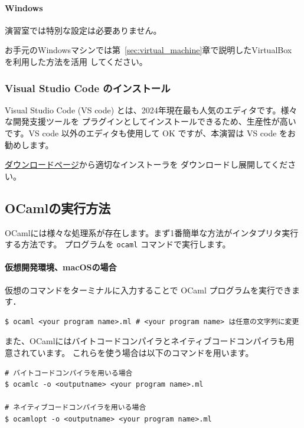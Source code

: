 \documentclass[a4paper,11pt]{jsarticle}
\begin{document}
\paragraph{Windows}

演習室では特別な設定は必要ありません。

お手元のWindowsマシンでは第~\ref{sec:virtual_machine}章で説明したVirtualBox を利用した方法を活用
してください。

\subsubsection{Visual Studio Code のインストール}

Visual Studio Code (VS code) とは、2024年現在最も人気のエディタです。様々な開発支援ツールを
プラグインとしてインストールできるため、生産性が高いです。VS code 以外のエディタも使用して
OK ですが、本演習は VS code をお勧めします。

\href{https://code.visualstudio.com/download}{ダウンロードページ}から適切なインストーラを
ダウンロードし展開してください。

\subsection{OCamlの実行方法}

OCamlには様々な処理系が存在します。まず1番簡単な方法がインタプリタ実行する方法です。
プログラムを \verb|ocaml| コマンドで実行します。

\paragraph*{仮想開発環境、macOSの場合}

仮想のコマンドをターミナルに入力することで OCaml プログラムを実行できます．

\begin{lstlisting}
$ ocaml <your program name>.ml # <your program name> は任意の文字列に変更
\end{lstlisting}

また、OCamlにはバイトコードコンパイラとネイティブコードコンパイラも用意されています。
これらを使う場合は以下のコマンドを用います。

\begin{lstlisting}
# バイトコードコンパイラを用いる場合
$ ocamlc -o <outputname> <your program name>.ml

# ネイティブコードコンパイラを用いる場合
$ ocamlopt -o <outputname> <your program name>.ml
\end{lstlisting}
\end{document}
